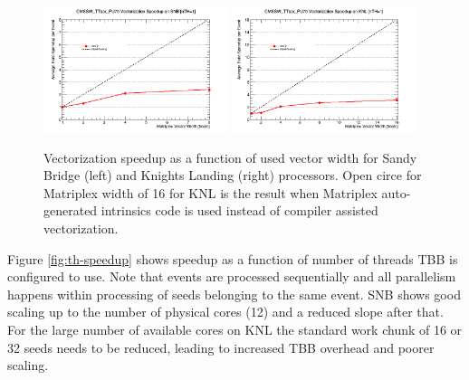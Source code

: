 \documentclass{webofc}
\def\twop{0.48\textwidth}
\def\postfigskip{\vskip-4mm}
\begin{document}
\begin{figure}[htb]
  \centering
  \includegraphics[width=\twop]{figs/comp/SNB_CMSSW_TTbar_PU70_VU_speedup.png}
  \hfill
  \includegraphics[width=\twop]{figs/comp/KNL_CMSSW_TTbar_PU70_VU_speedup.png}
  \postfigskip

  \caption{Vectorization speedup as a function of used vector width for Sandy
    Bridge (left) and Knights Landing (right)
    processors. Open circe for Matriplex width of 16 for KNL is the result
    when Matriplex auto-generated intrinsics code is used instead of compiler
    assisted vectorization.}
  \label{fig:vu-speedup}
\end{figure}

Figure \ref{fig:th-speedup} shows speedup as a function of number of threads
TBB is configured to use. Note that events are processed sequentially and all
parallelism happens within processing of seeds belonging to the same
event. SNB shows good scaling up to the number of physical cores (12) and a
reduced slope after that. For the large number of available cores on KNL the
standard work chunk of 16 or 32 seeds needs to be reduced, leading to
increased TBB overhead and poorer scaling.
\end{document}

